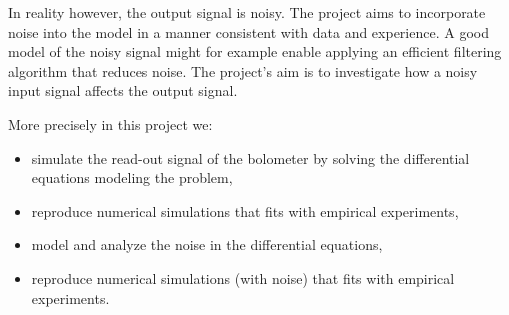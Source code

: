 In reality however, the output signal is noisy. The project aims to
incorporate noise into the model in a manner consistent with data and
experience. A good model of the noisy signal might for example enable
applying an efficient filtering algorithm that reduces noise. The project's aim is to investigate how a noisy input signal affects the output signal.

More precisely in this project we:
\begin{itemize}
 \item simulate the read-out signal of the bolometer by solving the differential equations modeling the problem,
 \item reproduce numerical simulations that fits with empirical experiments,
 \item model and analyze the noise in the differential equations,
 \item reproduce numerical simulations (with noise) that fits with empirical experiments.
\end{itemize}

